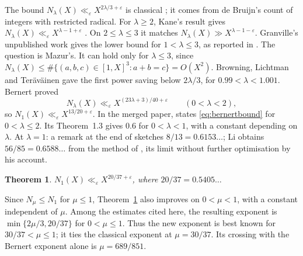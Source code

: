 \documentclass{amsart}
\newtheorem{theorem}{Theorem}
\theoremstyle{definition}
\theoremstyle{plain}
\numberwithin{equation}{section}
\numberwithin{table}{section}
\begin{document}
The bound $N_\lambda(X)\ll_\varepsilon X^{2\lambda/3+\varepsilon}$ is
classical \cite[Proposition~1.1]{BBLT}; it comes from de Bruijn's count
\cite{dB} of integers with restricted radical. For $\lambda\ge2$, Kane's result
\cite{Ka} gives $N_\lambda(X)\ll_\varepsilon X^{\lambda-1+\varepsilon}$
\cite[Section~1]{BBLT}. On $2\le\lambda\le3$ it matches
$N_\lambda(X)\gg X^{\lambda-1-\varepsilon}$. Granville's unpublished work gives the lower bound for $1<\lambda\le3$, as
reported in \cite[Section~1]{BBLT}. The question is Mazur's. It can hold only for
$\lambda\le3$, since
$N_\lambda(X)\le\#\{(a,b,c)\in[1,X]^3:a+b=c\}=O(X^2)$. Browning, Lichtman and
Ter\"av\"ainen \cite[Theorem~1.2]{BLT} gave the first power saving below
$2\lambda/3$, for $0.99<\lambda<1.001$. Bernert \cite[Theorem~1]{Be} proved
\begin{equation}\label{eq:bernertbound}
 N_\lambda(X)\ll_\varepsilon X^{(23\lambda+3)/40+\varepsilon}
 \qquad(0<\lambda<2),
\end{equation}
so $N_1(X)\ll_\varepsilon X^{13/20+\varepsilon}$. In the merged paper,
\cite[Theorem~1.2]{BBLT} states \eqref{eq:bernertbound} for $0<\lambda\le2$.
Its Theorem~1.3 gives $0.6$ for $0<\lambda<1$, with a constant depending on
$\lambda$. At $\lambda=1$: a remark at the end of
\cite[Section~4]{Be} sketches $8/13=0.6153\ldots$; Li \cite{Li} obtains
$56/85=0.6588\ldots$ from the method of \cite{BLT}, its limit without further
optimisation by his account.

\begin{theorem}\label{thm:main}
$N_1(X)\ll_\varepsilon X^{20/37+\varepsilon}$, where $20/37=0.5405\ldots$
\end{theorem}

Since $N_\mu\le N_1$ for $\mu\le1$, Theorem~\ref{thm:main} also improves
\cite[Theorem~1.3]{BBLT} on $0<\mu<1$, with a constant independent of $\mu$.
Among the estimates cited here, the resulting exponent is
$\min\{2\mu/3,20/37\}$ for $0<\mu\le1$. Thus the new exponent is best known
for $30/37<\mu\le1$; it ties the classical exponent at $\mu=30/37$.
Its crossing with the Bernert exponent alone is $\mu=689/851$.
\end{document}
